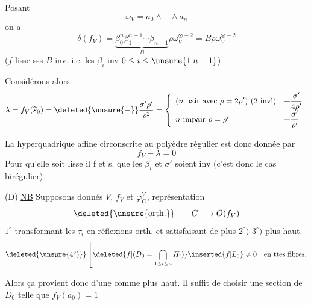 Posant
\[
\omega_V=a_0\wedge\mathbin{-}\wedge a_n
\]
on a
\[
\delta(f_V)
=\underbrace{\beta_0^n\beta_1^{n-1}\cdots\beta_{n-1}}_B
\rho\omega_V^{\otimes-2}
=B\rho\omega_V^{\otimes-2}
\]
($f$ lisse sss $B$ inv. i.e. les $\beta_i$ inv
\quad$0\leq i\leq\unsure{1|n-1}$)

Considérons alors
\[
\lambda=f_V(\widetilde s_0)
=\deleted{\unsure{-}}\frac{\sigma'\rho'}{\rho^2}
=\left\{\begin{array}{ll}
(n\text{ pair avec }\rho=2\rho')\ (2\text{ inv!})
&+\dfrac{\sigma'}{4\rho'}\\
n\text{ impair }\rho=\rho'
&+\dfrac{\sigma'}{\rho'}
\end{array}\right.
\]

La hyperquadrique affine circonscrite au polyèdre régulier est donc donnée par
\[
f_V-\lambda=0
\]
Pour qu'elle soit 
lisse il f et s. que les $\beta_i$ et $\sigma'$ soient inv
(c'est donc le cas \uline{birégulier})

(D) \uline{NB} Supposons donnés $V$, $f_V$ et $\varphi_G^V$,
représentation
\[
\deleted{\text{\unsure{orth.}}}\qquad G\longrightarrow O(f_V)
\]
$1^\circ$ transformant les $\tau_i$ en réflexions \uline{orth.}
et satisfaisant de plus $2^\circ)$ $3^\circ)$ plus haut.
\[
\deleted{\unsure{4^\circ)}}
\left[
\deleted{f|(D_0=\bigcap_{1\leq i\leq n}H_i)}
\inserted{f|L_0}\neq0\quad\text{en ttes fibres.}
\right.
\]

Alors ça provient donc  d'une  \uline{}
comme plus haut. Il suffit de choisir une section  de $D_0$
telle que $f_V(a_0)=1$


